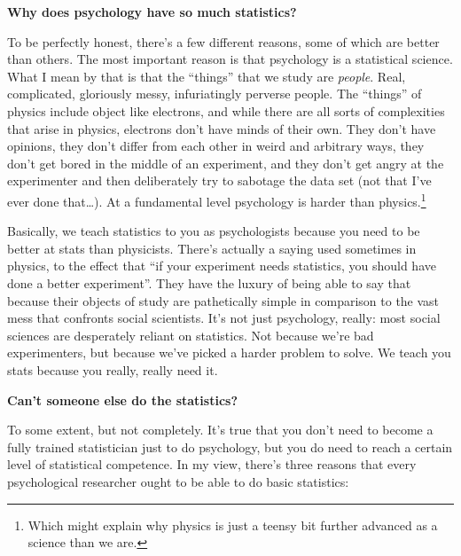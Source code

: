 \documentclass[]{book}
\let\rmarkdownfootnote\footnote%
\def\footnote{\protect\rmarkdownfootnote}
\begin{document}
\textbf{Why does psychology have so much statistics?}

To be perfectly honest, there's a few different reasons, some of which are better than others. The most important reason is that psychology is a statistical science. What I mean by that is that the ``things'' that we study are \emph{people}. Real, complicated, gloriously messy, infuriatingly perverse people. The ``things'' of physics include object like electrons, and while there are all sorts of complexities that arise in physics, electrons don't have minds of their own. They don't have opinions, they don't differ from each other in weird and arbitrary ways, they don't get bored in the middle of an experiment, and they don't get angry at the experimenter and then deliberately try to sabotage the data set (not that I've ever done that\ldots{}). At a fundamental level psychology is harder than physics.\footnote{Which might explain why physics is just a teensy bit further advanced as a science than we are.}

Basically, we teach statistics to you as psychologists because you need to be better at stats than physicists. There's actually a saying used sometimes in physics, to the effect that ``if your experiment needs statistics, you should have done a better experiment''. They have the luxury of being able to say that because their objects of study are pathetically simple in comparison to the vast mess that confronts social scientists. It's not just psychology, really: most social sciences are desperately reliant on statistics. Not because we're bad experimenters, but because we've picked a harder problem to solve. We teach you stats because you really, really need it.

\textbf{Can't someone else do the statistics?}

To some extent, but not completely. It's true that you don't need to become a fully trained statistician just to do psychology, but you do need to reach a certain level of statistical competence. In my view, there's three reasons that every psychological researcher ought to be able to do basic statistics:
\end{document}
